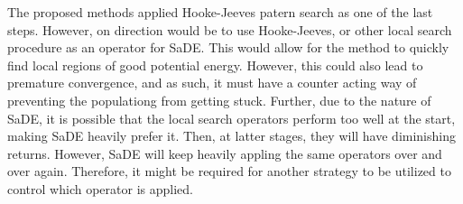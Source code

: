The proposed methods applied Hooke-Jeeves patern search as one of the last steps.
However, on direction would be to use Hooke-Jeeves, or other local search
procedure as an operator for SaDE. This would allow for the method to quickly
find local regions of good potential energy. However, this could also lead to
premature convergence, and as such, it must have a counter acting way of
preventing the populationg from getting stuck. Further, due to the nature of
SaDE, it is possible that the local search operators perform too well at the
start, making SaDE heavily prefer it. Then, at latter stages, they will
have diminishing returns. However, SaDE will keep heavily appling the
same operators over and over again. Therefore, it might be required for another
strategy to be utilized to control which operator is applied.
